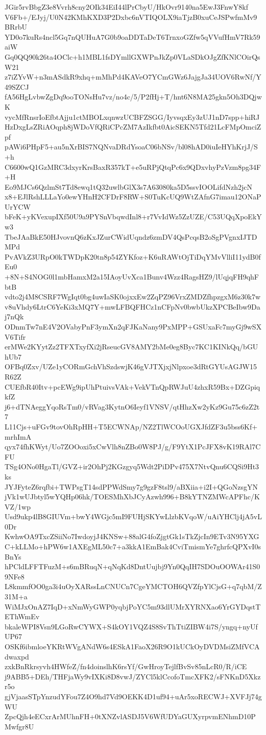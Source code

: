 JGir5rvBbgZ3e8Vvrh8cny2OIk34EiI44lPrCbyU/HkOvr9140na5EwJ3FnwY8kf
V6Fb+/EJyj/U0N42KMhKXD3P2Dxbc6nVTIQOLX9iaTjzB0xuCeJSPwfmMv9BRrbU
YD0o7kuRs4ncl5Gq7nQUHuA7G0b9oaDDTaDeT6TrnxoGZfw5qVVufHmV7Rk59aiW
Gq0QQ90k26ta4OClc+h1MBL1fsDYmllGXWPnJkZp0VLaSDkOJgZfKNlCOirQsW21
z7iZYvW+n3mASdkR9xhq+mMhPd4KAVeO7YCmGWz6JajgJa34UOV6RwNf/Y49SZCJ
fA56HgLvbwZgDq9ooTONsHu7vz/no4c/5/P2fHj+T/hnt6N8MA25gkn5Oh3DQjwK
vycMfRnsrIoEfbtAjju1ctMBOLxqnwzUCBFZSGG/IyvsqxEy3zUJ1nD7spp+hiRJ
HzDxgLsZRiAOqph8jWDoVfQRiCPcZM7AzIkfbt0AicSEKN5Tfd21LcFMpOmciZpf
pAWi6PHpF5+au5nXrBIS7NQNvaDRdYsoaC06bNSv/bl08hAD0iuIeHYhKrjJ/S+h
C6600wQ1GzMRC3dxyrKrsBaxR357kT+e5uRPjQtqPc6x9QDxvhyPzVzm8pg34F+H
Eo9MJCs6QzlmSt7Td8ewq1tQ32uwlbGlX3s7A63080ka5D5ssvIOOLifdNzh2jcN
x8+EJlRshLLLaYo0ewYHnH2CFDrF8RW+S0TuKcUQ9WtZAfnG7imau12ONaPUrYCW
bFeK+yKVexupIXf50U9a9PYSnVbqwdInl8+r7VvIdWz5ZzUZE/C53UQqXpoEkYw3
TbeJAaBkE50HJvovnQ6zKxJZurCWidUqndz6zmDV4QsPcqsB2oSgPVgnxIJTDMPd
PvAVkZ3URpO0kTWDpK20tn8p54ZYKfoz+K6uRAWtOjTiDqYMvVlliI11ydB0fEu0
+8N+S4NOG0l1mbHamxM2a15IAoyUvXca1Bunv4Wzz4RagsHZ9/lUqjqFH9qhFbtB
vdto2j4M8CSRF7WgIqt0bg4uwIaSK0ojxxEw2ZqPZ96VrxZMDZfhpzgxM6z30k7w
v8uVhdy6LtrC6YeKi3xMQ7Y+mwLFBQFHCz1nCFpNv0bwbUkzXPCBeIbw9Daj7nQk
ODnmTw7nE4V2OVabyPnF3ymXn2qFJKaNany9PxMPP+GSUxaFc7myGj9wSXV6Tifr
erMWe2KYytZz2TFXTxyfXi2jRseucGV8AMY2bMe0eg8Byc7KC1KINkQq/bGUhUb7
OFBq0Zxv/UZe1yCORmGchVhSzdswjK46gVJTXjxjNlpxoe3dRtGYUsAGJW15R62Z
CUEfbR40Itv+pcEWg9ipUhPtuivsVAk+VekVTnQpRWJuU4zhxR59Bx+DZGpiqkfZ
j6+dTNAeggYqoRsTm0/vRVag3KytnO6Ieyf1VNSV/qtHhzXw2yKz9Gu75c6zZ2t7
L11Cjs+uFGv9tovOhRpHH+T5ECWNAp/NZ2TlWCOoUGXJfdZF3u5bss6Kf+mrhImA
qyx74fhKWyt/Uo7ZOOoxi5xCwVlh8nZBo0W8PJ/g/F9YtX1PcJFX8vK19RAl7CFU
TSg4ONo0HgaTl/GVZ+ir2OhPj2KGzgyq5Wdt2PiDPv475X7NtvQnu6CQSi9Ht3ks
JYJFyteZ6rqfbi+TWPsgT14sdPPWdSmy7g9gzF8tsl9/aBXiia+i2I+QGoNzsgYN
jVk1wUJbtyl5wYQHp06hk/TOESMhXbJCyAzwh996+B8kYTNZMWcAPFhc/KVZ/1wp
Usd9ukp4lB8GIUVm+bwY4WGjc5mI9FUHjSKYwLlzbKVqoW/uAiYHClj4jA5vL0Dr
KwhwOA9TxcZSiiNo7IwdoyjJ4KNSw+88alG4foZjgtGk1sTkZjcIn9ETv3N95YXG
C+kLLMo+hPW6w1AXEgML50c7+a3kkA1EmBak4CviTmismYe7ghrfcQPXvI0sBnYs
hPCldLFFTFuzM+s6mBRuqN+qNqKd8DntUujbj9Yn0QqIH7SDOuOOWAr41S09NFe8
L8kmmfOO0ga3i4uOyXARssLnCNUCn7CgeYMCTOH6QVZfpYlCjsG+q7qbM/Z31M+a
WiMJxOnAZ7IqD+xNmWyGWP0yqbjPoYC5m93dlUMrXYRNXao6YrGYDqstTEThWmEv
bkaleWPI8Vsn9LGoRwCYWX+S4kOY1VQZ4S8SvThTtiZIBW4i7S/yngq+nyUfUP67
OSKf6ibmloeYKRtWVgANdW6s4ESkA1FaoX26R9O1kUCkOyDVDMsiZMfVCAdwaxpd
zxkBnRkrsyvh4HWfeZ/fn4doinslhK6rsYf/GwHroyTejlfBvSv85nLcR0/R/iCE
j9ABB5+DEh/THFjaWy9vIXKi8D8vwJ/ZYCl5klCcofoTmcXFK2/sFNKnD5Xkzr5o
gjVjaasSTpYnzudYFou7Z4O9hd7Vd9OEKK4D1uf94+uAr5xoRECWJ+XVFJj74gWU
ZpcQjh4eECxrArMUhnFH+0tXNZvlASDJ5V6WfUDYaGUXyrpvmENhmD10PMwfgr8U
